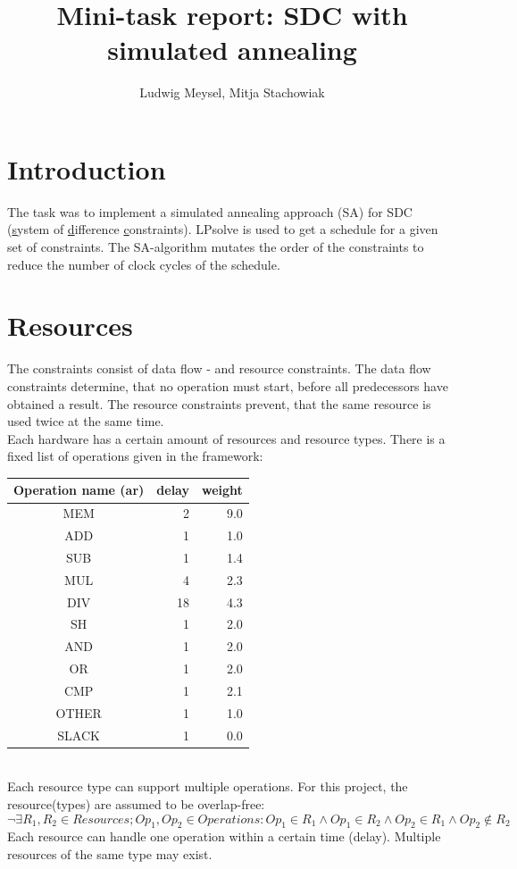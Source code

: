 \documentclass[colorback,accentcolor=tud1c,11pt]{tudreport}
\title{Mini-task report: SDC with simulated annealing}
\subtitle{Ludwig Meysel, Mitja Stachowiak}
\begin{document}
  \maketitle

  \chapter{Introduction}
  The task was to implement a simulated annealing approach (SA) for SDC (\underline{s}ystem of \underline{d}ifference \underline{c}onstraints). LPsolve is used to get a schedule for a given set of constraints. The SA-algorithm mutates the order of the constraints to reduce the number of clock cycles of the schedule.
  
  
  
  \chapter{Resources}
  The constraints consist of data flow - and resource constraints. The data flow constraints determine, that no operation must start, before all predecessors have obtained a result. The resource constraints prevent, that the same resource is used twice at the same time.\cite{SDCFormulation}\\
  Each hardware has a certain amount of resources and resource types. There is a fixed list of operations given in the framework:\\
  \begin{tabular}{ c | r | r }
  	Operation name (ar) & delay & weight \\
  	\hline
  	MEM   &  2 & 9.0 \\
  	ADD   &  1 & 1.0 \\
  	SUB   &  1 & 1.4 \\
  	MUL   &  4 & 2.3 \\
  	DIV   & 18 & 4.3 \\
  	SH    &  1 & 2.0 \\
  	AND   &  1 & 2.0 \\
  	OR    &  1 & 2.0 \\
  	CMP   &  1 & 2.1 \\
  	OTHER &  1 & 1.0 \\
  	SLACK &  1 & 0.0 \\
  \end{tabular}\\
  Each resource type can support multiple operations. For this project, the resource(types) are assumed to be overlap-free:
  $$\neg \exists R_1, R_2 \in Resources; Op_1, Op_2 \in Operations : Op_1 \in R_1 \land Op_1 \in R_2 \land Op_2 \in R_1 \land Op_2 \notin R_2$$
  Each resource can handle one operation within a certain time (delay). Multiple resources of the same type may exist.
  
\end{document}
